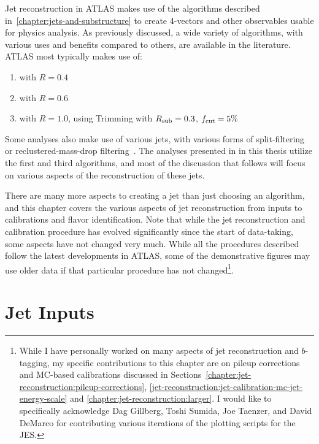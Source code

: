 \label{chapter:jet-reconstruction}


Jet reconstruction in ATLAS makes use of the algorithms described in~\ref{chapter:jets-and-substructure} to create 4-vectors and other observables usable for physics analysis. As previously discussed, a wide variety of algorithms, with various uses and benefits compared to others, are available in the literature. ATLAS most typically makes use of:

\begin{enumerate}
	\item \antikt with $R = 0.4$
	\item \antikt with $R = 0.6$
	\item \antikt with $R = 1.0$, using Trimming with $R_{\rm sub} = 0.3$, $f_{\rm cut} = 5\%$
\end{enumerate}
%
Some analyses also make use of various \CAFat jets, with various forms of split-filtering or reclustered-mass-drop filtering~\cite{Aad:2013oja,Aad:2015owa,Aad:2014xka}. The analyses presented in in this thesis utilize the first and third algorithms, and most of the discussion that follows will focus on various aspects of the reconstruction of these jets.

There are many more aspects to creating a jet than just choosing an algorithm, and this chapter covers the various aspects of jet reconstruction from inputs to calibrations and flavor identification. Note that while the jet reconstruction and calibration procedure has evolved significantly since the start of data-taking, some aspects have not changed very much. While all the procedures described follow the latest developments in ATLAS, some of the demonstrative figures may use older data if that particular procedure has not changed\footnote{While I have personally worked on many aspects of jet reconstruction and $b$-tagging, my specific contributions to this chapter are on pileup corrections and MC-based calibrations discussed in Sections~\ref{chapter:jet-reconstruction:pileup-corrections}, \ref{jet-reconstruction:jet-calibration-mc-jet-energy-scale} and \ref{chapter:jet-reconstruction:larger}. I would like to specifically acknowledge Dag Gillberg, Toshi Sumida, Joe Taenzer, and David DeMarco for contributing various iterations of the plotting scripts for the JES.}.

\section{Jet Inputs}


